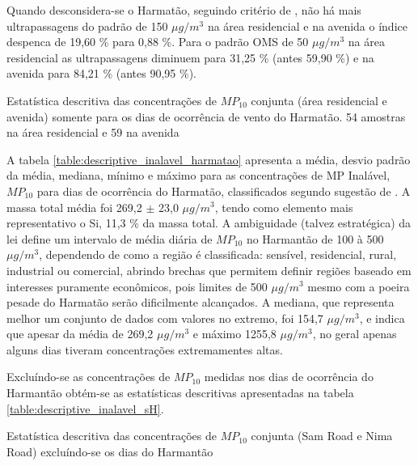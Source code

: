 Quando desconsidera-se o Harmatão, seguindo critério de \citet{aboh2009},
não há mais ultrapassagens do padrão de 150 $\mu g / m^3$ na área residencial 
e na avenida o índice despenca de 19,60 \% para 0,88 \%. 
Para o padrão OMS de 50 $\mu g / m^3$ na área residencial as 
ultrapassagens diminuem para 31,25 \% (antes 59,90 \%) e na avenida para 
84,21 \% (antes 90,95 \%).

\begin{table}[H]
  \centering
  
  \caption{Estatística descritiva das concentrações de $MP_{10}$ conjunta
           (área residencial e avenida) somente para os dias de ocorrência 
           de vento do Harmatão. 54 amostras na área residencial e 59 na avenida 
          \label{table:descriptive_inalavel_harmatao}}
\end{table}

A tabela \ref{table:descriptive_inalavel_harmatao} apresenta a média, 
desvio padrão da média, mediana, mínimo e máximo para as concentrações de 
MP Inalável, $MP_{10}$ para dias de ocorrência do Harmatão, classificados
segundo sugestão de \citet{aboh2009}. A massa total média foi 269,2 $\pm$ 23,0
$\mu g/ m^3$, tendo como elemento mais representativo o Si, 11,3 \% da massa total. 
A ambiguidade (talvez estratégica) da lei define um intervalo de média diária 
de $MP_{10}$ no Harmantão de 100 à 500 $\mu g/ m^3$, dependendo de como a região
é classificada: sensível, residencial, rural, industrial ou comercial, abrindo
brechas que permitem definir regiões baseado em interesses puramente econômicos,
pois limites de 500 $\mu g/ m^3$ mesmo com a poeira pesade do Harmatão serão
dificilmente alcançados. A mediana, que representa melhor um conjunto de dados
com valores no extremo, foi 154,7 $\mu g/ m^3$, e indica que apesar da média 
de 269,2 $\mu g/ m^3$ e máximo 1255,8 $\mu g/ m^3$, no geral apenas alguns
dias tiveram concentrações extremamentes altas. 

Excluíndo-se as concentrações de $MP_{10}$ medidas nos dias de 
ocorrência do Harmantão obtém-se as estatísticas descritivas apresentadas na 
tabela \ref{table:descriptive_inalavel_sH}.

\begin{table}[H]
  \centering
    
  \caption{Estatística descritiva das concentrações de $MP_{10}$ conjunta 
           (Sam Road e Nima Road) excluíndo-se os dias do Harmantão
            \label{table:descriptive_inalavel_sH}}
\end{table}

